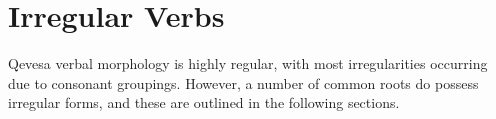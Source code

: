 \documentclass[grammar]{subfiles}
\begin{document}
%
%
%
%
%
%
%
  \section{Irregular Verbs}
  \label{sec:vm_irregular}

  Qevesa verbal morphology is highly regular, with most irregularities occurring due to consonant groupings. %
  However, a number of common roots do possess irregular forms, and these are outlined in the following sections.
  
  \ToBeWritten
\end{document}
